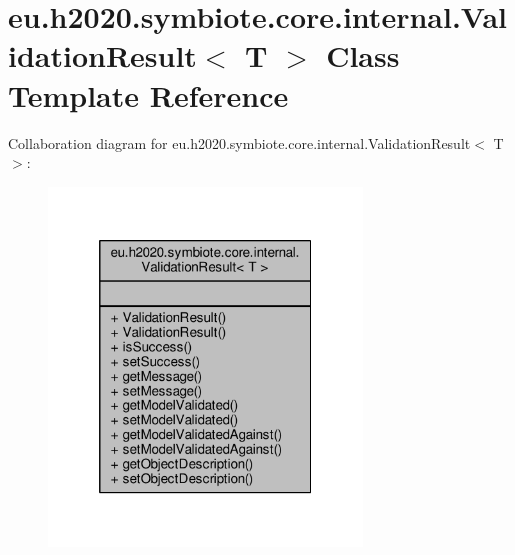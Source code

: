 \hypertarget{classeu_1_1h2020_1_1symbiote_1_1core_1_1internal_1_1ValidationResult}{}\section{eu.\+h2020.\+symbiote.\+core.\+internal.\+Validation\+Result$<$ T $>$ Class Template Reference}
\label{classeu_1_1h2020_1_1symbiote_1_1core_1_1internal_1_1ValidationResult}


Collaboration diagram for eu.\+h2020.\+symbiote.\+core.\+internal.\+Validation\+Result$<$ T $>$\+:
\nopagebreak
\begin{figure}[H]
\begin{center}
\leavevmode
\includegraphics[width=236pt]{classeu_1_1h2020_1_1symbiote_1_1core_1_1internal_1_1ValidationResult__coll__graph}
\end{center}
\end{figure}
